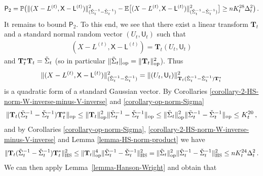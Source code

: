 \documentclass[11pt]{article}
\numberwithin{equation}{section}
\begin{document}
\begin{align*}
    \mathsf P_2 =  \mathbb P \big(
    \| (X-L^{(t)}, \mathsf{X} - \mathsf{L}^{(t)}) \|^2_{ ( \Tilde{\Sigma}_{t}^{-1} - \Check{\Sigma}_{t}^{-1} ) } - \mathbb{E} \big[ (X-L^{(t)}, \mathsf{X} - \mathsf{L}^{(t)}) \|^2_{ ( \Tilde{\Sigma}_{t}^{-1} - \Check{\Sigma}_{t}^{-1} ) } \big] \geq n K_t^{28} \Delta_t^2 \big) \,.  
\end{align*}
It remains to bound $\mathsf P_2$. To this end,  we see that there exist a linear transform $\mathbf{T}_{t}$ and a standard normal random vector $(U_{t},\mathsf{U}_{t})$ such that 
\begin{align*}
    (X-L^{(t)}, \mathsf{X} - \mathsf{L}^{(t)}) = \mathbf{T}_{t} (U_{t},\mathsf{U}_{t})
\end{align*}
and $\mathbf{T}_{t}^{*}\mathbf{T}_{t} = \Tilde{\Sigma}_{t}$ (so in particular $\| \Tilde{\Sigma}_{t} \|_{\mathrm{op}} = \| \mathbf{T}_{t} \|^2_{\mathrm{op}}$). Thus
\begin{align*}
    \| (X-L^{(t)}, \mathsf{X} - \mathsf{L}^{(t)}) \|^2_{( \Tilde{\Sigma}_{t}^{-1} - \Check{\Sigma}_{t}^{-1} )} = \| (U_{t},\mathsf{U}_{t}) \|^2_{ \mathbf{T}_{t}(  \Tilde{\Sigma}_{t}^{-1} - \Check{\Sigma}_{t}^{-1} ) \mathbf{T}_{t}^{*} }
\end{align*}
is a quadratic form of a standard Gaussian vector. By Corollaries \ref{corollary-2-HS-norm-W-inverse-minus-V-inverse} and  \ref{corollary-op-norm-Sigma} 
\begin{align*}
    \| \mathbf{T}_{t}( \Tilde{\Sigma}_{t}^{-1} - \Check{\Sigma}_{t}^{-1} ) \mathbf{T}_{t}^{*} \|_{\mathrm{op}} \leq \| \mathbf{T}_{t} \|^2_{\mathrm{op}} \|  \Tilde{\Sigma}_{t}^{-1} - \Check{\Sigma}_{t}^{-1} \|_{\mathrm{op}} \leq \| \Tilde{\Sigma}_{t} \|_{\mathrm{op}}^2 \|  \Tilde{\Sigma}_{t}^{-1} - \Check{\Sigma}_{t}^{-1} \|_{\mathrm{op}} \leq K_{t}^{20}\,,
\end{align*}
and by Corollaries \ref{corollary-op-norm-Sigma}, \ref{corollary-2-HS-norm-W-inverse-minus-V-inverse} and Lemma \ref{lemma-HS-norm-product} we have
\begin{align*}
    \| \mathbf{T}_{t}(  \Tilde{\Sigma}_{t}^{-1} - \Check{\Sigma}_{t}^{-1} ) \mathbf{T}_{t}^{*} \|_{\mathrm{HS}}^2 \leq \| \mathbf{T}_{t} \|^4_{\mathrm{op}} \|  \Tilde{\Sigma}_{t}^{-1} - \Check{\Sigma}_{t}^{-1} \|_{\mathrm{HS}}^2 = \| \Tilde{\Sigma}_t \|_{\mathrm{op}}^2 \|  \Tilde{\Sigma}_{t}^{-1} - \Check{\Sigma}_{t}^{-1} \|_{\mathrm{HS}}^2 \leq n K_{t}^{24} \Delta_{t}^2\,.
\end{align*}
We can then apply  Lemma~\ref{lemma-Hanson-Wright} and obtain that 
\end{document}
